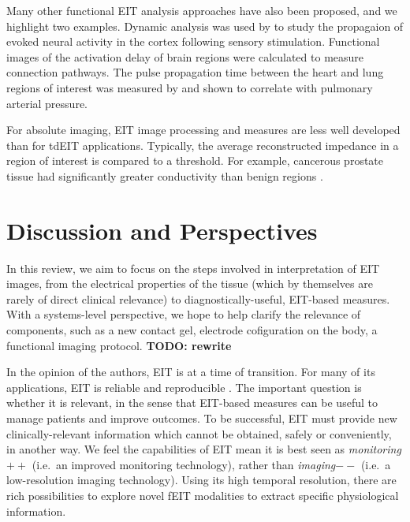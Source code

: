 \documentclass[12pt]{article} \usepackage[margin=3cm]{geometry} \usepackage[margin=20pt,font=small,labelfont=bf]{caption}\def\TBLWIDA{35mm}\def\TBLWIDB{95mm}
\newcommand{\TODO}[1]{{\bf TODO: #1}}
\begin{document}
Many other functional EIT analysis approaches have also been proposed,
and we highlight two examples.
Dynamic analysis was used by
\cite{Aristovich2014Neural}
to study
the propagaion of evoked neural activity in the cortex following
sensory stimulation.  Functional images of the activation delay
of brain regions were calculated to measure connection pathways.
The pulse propagation time between the heart and lung regions
of interest was measured by \cite{Proenca2016Noninvasive} and
shown to correlate with pulmonary arterial pressure.

For absolute imaging, EIT image processing and measures are less
well developed than for tdEIT applications. Typically, the
average reconstructed impedance in a region of interest
is compared to a threshold. For example, cancerous prostate
tissue had significantly greater conductivity than benign
regions \cite{Wan2013Transrectal}.


\section{Discussion and Perspectives}

In this review, we aim to focus
on the steps involved in interpretation
of EIT images, from the electrical properties of the
tissue (which by themselves are rarely of direct
clinical relevance) to diagnostically-useful,
EIT-based measures. With a systems-level perspective,
we hope to help clarify the relevance of components,
such as a new contact gel, electrode cofiguration on 
the body, a functional imaging protocol.
\TODO{rewrite}

In the opinion of the authors, EIT is at a time of transition.
For many of its applications, EIT is reliable
and reproducible \cite{Adler2012Whither, Frerichs2017Chest}. The
important question is whether it is relevant, in the sense that
EIT-based measures can be useful to manage patients and improve outcomes.
To be successful, EIT must provide new clinically-relevant
information which cannot be obtained, safely or conveniently, in another way.
We feel the capabilities of EIT mean it is 
best seen as {\em monitoring$++$}
 (i.e.\ an improved  monitoring technology),
rather than {\em imaging$--$}
 (i.e.\ a low-resolution imaging technology).
Using its high temporal resolution, there are rich possibilities
to explore novel fEIT modalities to extract specific physiological
information.
\end{document}
